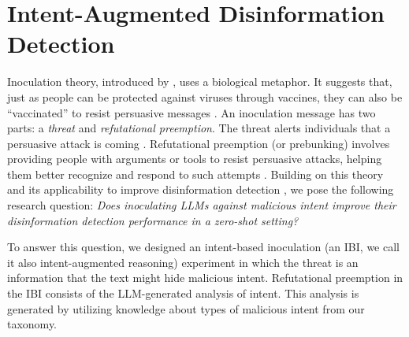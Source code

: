 \documentclass[11pt]{article}
\begin{document}
\section{Intent-Augmented Disinformation Detection}

Inoculation theory, introduced by \citet{mcguire1964inducing}, uses a biological metaphor. It suggests that, just as people can be protected against viruses through vaccines, they can also be “vaccinated” to resist persuasive messages
\cite{mcguire1964inducing}. An inoculation message has two parts: a \textit{threat} and \textit{refutational preemption}. The threat alerts individuals that a persuasive attack is coming \cite{lewandowsky2017beyond}. Refutational preemption (or prebunking) involves providing people with arguments or tools to resist persuasive attacks, helping them better recognize and respond to such attempts \cite{pfau2005inoculation}. Building on this theory and its applicability to improve disinformation detection \cite{traberg2022psychological}, we pose the following research question: \textit{Does inoculating LLMs against malicious intent improve their disinformation detection performance in a zero-shot setting?}

To answer this question, we designed an intent-based inoculation (an IBI, we call it also intent-augmented reasoning) experiment in which the threat is an information that the text might hide malicious intent. Refutational preemption in the IBI consists of the LLM-generated analysis of intent. This analysis is generated by utilizing knowledge about types of malicious intent from our taxonomy. 
\end{document}
